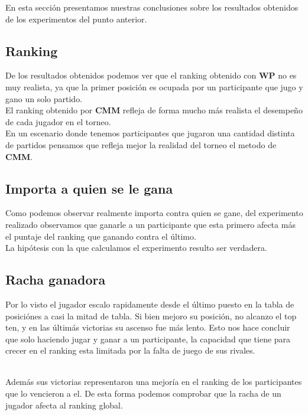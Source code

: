 En esta sección presentamos nuestras conclusiones sobre los resultados obtenidos de los experimentos del punto anterior. \\

\subsection{Ranking}

De los resultados obtenidos podemos ver que el ranking obtenido con \textbf{WP} no es muy realista, ya que la primer posición es ocupada por un participante que jugo y gano un solo partido. \\

El ranking obtenido por \textbf{CMM} refleja de forma mucho m\'as realista el desempeño de cada jugador en el torneo. \\

En un escenario donde tenemos participantes que jugaron una cantidad distinta de partidos pensamos que refleja mejor la realidad del torneo el metodo de \textbf{CMM}. \\


\subsection{\¿Importa a quien se le gana\?}

Como podemos observar realmente importa contra quien se gane, del experimento realizado observamos que ganarle a un participante que esta primero afecta m\'as el puntaje del ranking que ganando 
contra el último. \\

La hipótesis con la que calculamos el experimento resulto ser verdadera.  \\


\subsection{Racha ganadora}

Por lo visto el jugador escalo rapidamente desde el último puesto en la tabla de posici\'ones a casi la mitad de tabla. Si bien mejoro su posición, no alcanzo el top ten, y en las últim\'as victorias su ascenso fue m\'as lento. Esto nos hace concluir que solo haciendo jugar y ganar a un participante, la capacidad que tiene para crecer en el ranking esta limitada por la falta de juego de sus rivales.

\\
Además sus victorias representaron una mejoría en el ranking de los participantes que lo vencieron a el. De esta forma podemos comprobar que la racha de un jugador afecta al ranking global.\\


